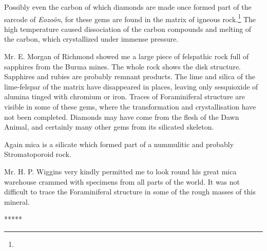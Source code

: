 \documentclass[a4paper, 12pt, oneside]{article}
\begin{document}
Possibly even the carbon of which diamonds are made once formed part of the sarcode of \emph{Eozoön}, for these gems are found in the matrix of igneous rock.\footnote{} The high temperature caused dissociation of the carbon compounds and melting of the carbon, which crystallized under immense pressure.

Mr. E. Morgan of Richmond showed me a large piece of felspathic rock full of sapphires from the Burma mines. The whole rock shows the disk structure. Sapphires and rubies are probably remnant products. The lime and silica of the lime-felspar of the matrix have disappeared in places, leaving only sesquioxide of alumina tinged with chromium or iron. Traces of Foraminiferal structure are visible in some of these gems, where the transformation and crystallisation have not been completed. Diamonds may have come from the flesh of the Dawn Animal, and certainly many other gems from its silicated skeleton.

Again mica is a silicate which formed part of a nummulitic and probably Stromatoporoid rock.

Mr. H. P. Wiggins very kindly permitted me to look round his great mica warehouse crammed with specimens from all parts of the world. It was not difficult to trace the Foraminiferal structure in some of the rough masses of this mineral.

\centerline{*\hspace{15mm}*\hspace{15mm}*\hspace{15mm}*\hspace{15mm}*}
\bigskip
\end{document}
